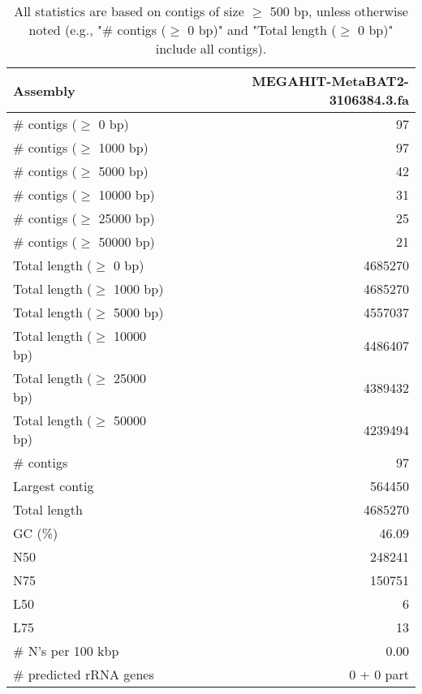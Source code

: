 \documentclass[12pt,a4paper]{article}
\begin{document}
\begin{table}[ht]
\begin{center}
\caption{All statistics are based on contigs of size $\geq$ 500 bp, unless otherwise noted (e.g., "\# contigs ($\geq$ 0 bp)" and "Total length ($\geq$ 0 bp)" include all contigs).}
\begin{tabular}{|l*{1}{|r}|}
\hline
Assembly & MEGAHIT-MetaBAT2-3106384.3.fa \\ \hline
\# contigs ($\geq$ 0 bp) & 97 \\ \hline
\# contigs ($\geq$ 1000 bp) & 97 \\ \hline
\# contigs ($\geq$ 5000 bp) & 42 \\ \hline
\# contigs ($\geq$ 10000 bp) & 31 \\ \hline
\# contigs ($\geq$ 25000 bp) & 25 \\ \hline
\# contigs ($\geq$ 50000 bp) & 21 \\ \hline
Total length ($\geq$ 0 bp) & 4685270 \\ \hline
Total length ($\geq$ 1000 bp) & 4685270 \\ \hline
Total length ($\geq$ 5000 bp) & 4557037 \\ \hline
Total length ($\geq$ 10000 bp) & 4486407 \\ \hline
Total length ($\geq$ 25000 bp) & 4389432 \\ \hline
Total length ($\geq$ 50000 bp) & 4239494 \\ \hline
\# contigs & 97 \\ \hline
Largest contig & 564450 \\ \hline
Total length & 4685270 \\ \hline
GC (\%) & 46.09 \\ \hline
N50 & 248241 \\ \hline
N75 & 150751 \\ \hline
L50 & 6 \\ \hline
L75 & 13 \\ \hline
\# N's per 100 kbp & 0.00 \\ \hline
\# predicted rRNA genes & 0 + 0 part \\ \hline
\end{tabular}
\end{center}
\end{table}
\end{document}
